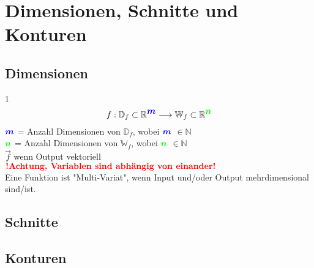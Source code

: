 \section{Dimensionen, Schnitte und Konturen}
\subsection{Dimensionen}{1}
$${ f: \mathbb{D}_f \subset \mathbb{R}^{{{\color{blue}\boldsymbol{{\textstyle m}}}}} \longrightarrow \mathbb{W}_f \subset \mathbb{R}^{{\color{green}\boldsymbol{\textstyle n}}} }$$
${\color{blue}\boldsymbol{m}}$ = Anzahl Dimensionen von ${\mathbb{D}_f}$, wobei ${\color{blue}\boldsymbol{m}}$ ${\in \mathbb{N} }$\\
${\color{green}\boldsymbol{n}}$ = Anzahl Dimensionen von ${\mathbb{W}_f}$, wobei ${\color{green}\boldsymbol{n}}$ ${\in \mathbb{N} }$\\
${\vec{f}}$ wenn Output vektoriell\\
$\textbf{{\color{red}!Achtung, Variablen sind abhängig von einander!}}$\\

Eine Funktion ist "Multi-Variat", wenn Input und/oder Output mehrdimensional sind/ist.\\

\subsection{Schnitte}
\subsection{Konturen}